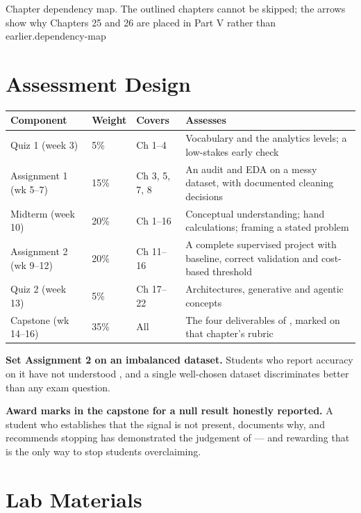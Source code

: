 {Chapter dependency map. The outlined chapters cannot be skipped; the arrows show why
Chapters 25 and 26 are placed in Part V rather than earlier.}{dependency-map}

\section{Assessment Design}

\begin{longtable}{@{}L{3.2cm}L{1.6cm}L{3.0cm}L{5.8cm}@{}}
\toprule
{}
\textbf{Component} & \textbf{Weight} & \textbf{Covers} & \textbf{Assesses} \\
\midrule
\endhead
Quiz 1 (week 3) & 5\% & Ch 1--4 & Vocabulary and the analytics levels; a low-stakes early check \\
Assignment 1 (wk 5--7) & 15\% & Ch 3, 5, 7, 8 & An audit and EDA on a messy dataset, with documented cleaning decisions \\
Midterm (week 10) & 20\% & Ch 1--16 & Conceptual understanding; hand calculations; framing a stated problem \\
Assignment 2 (wk 9--12) & 20\% & Ch 11--16 & A complete supervised project with baseline, correct validation and cost-based threshold \\
Quiz 2 (week 13) & 5\% & Ch 17--22 & Architectures, generative and agentic concepts \\
Capstone (wk 14--16) & 35\% & All & The four deliverables of , marked on that chapter's rubric \\
\bottomrule
\end{longtable}

\begin{conceptbox}
\textbf{Set Assignment 2 on an imbalanced dataset.} Students who report accuracy on
it have not understood , and a single well-chosen dataset
discriminates better than any exam question.

\textbf{Award marks in the capstone for a null result honestly reported.} A student
who establishes that the signal is not present, documents why, and recommends
stopping has demonstrated the judgement of  --- and rewarding
that is the only way to stop students overclaiming.
\end{conceptbox}

\section{Lab Materials}

